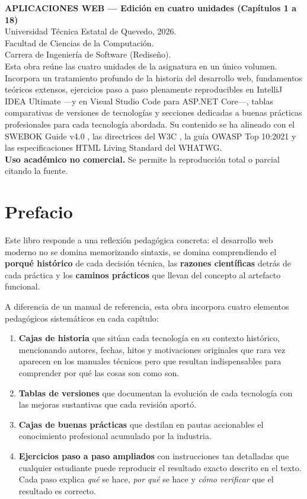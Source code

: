 \documentclass[11pt,a4paper,openany]{book}
\begin{document}
\thispagestyle{empty}
\vspace*{2cm}
\noindent\textbf{APLICACIONES WEB --- Edición en cuatro unidades (Capítulos 1 a 18)}\\[0.3cm]
\noindent Universidad Técnica Estatal de Quevedo, 2026.\\
Facultad de Ciencias de la Computación.\\
Carrera de Ingeniería de Software (Rediseño).\\[0.4cm]
\noindent Esta obra reúne las cuatro unidades de la asignatura en un único
volumen. Incorpora un tratamiento profundo de la historia del desarrollo
web, fundamentos teóricos extensos, ejercicios paso a paso plenamente
reproducibles en IntelliJ IDEA Ultimate ---y en Visual Studio Code para
ASP.NET Core---, tablas comparativas de versiones de tecnologías y
secciones dedicadas a buenas prácticas profesionales para cada tecnología
abordada. Su contenido se ha alineado con el SWEBOK Guide v4.0
\cite{washizaki2024swebok}, las directrices del W3C \cite{w3c2018wcag}, la
guía OWASP Top 10:2021 \cite{owasp2021top10} y las especificaciones HTML
Living Standard del WHATWG.\\[0.4cm]
\noindent\textbf{Uso académico no comercial.} Se permite la reproducción
total o parcial citando la fuente.
\newpage

\chapter*{Prefacio}

Este libro responde a una reflexión pedagógica concreta: el desarrollo web
moderno no se domina memorizando sintaxis, se domina comprendiendo el
\textbf{porqué histórico} de cada decisión técnica, las \textbf{razones
científicas} detrás de cada práctica y los \textbf{caminos prácticos} que
llevan del concepto al artefacto funcional.

A diferencia de un manual de referencia, esta obra incorpora cuatro
elementos pedagógicos sistemáticos en cada capítulo:

\begin{enumerate}
\item \textbf{Cajas de historia} que sitúan cada tecnología en su contexto
histórico, mencionando autores, fechas, hitos y motivaciones originales que
rara vez aparecen en los manuales técnicos pero que resultan indispensables
para comprender por qué las cosas son como son.
\item \textbf{Tablas de versiones} que documentan la evolución de cada
tecnología con las mejoras sustantivas que cada revisión aportó.
\item \textbf{Cajas de buenas prácticas} que destilan en pautas accionables
el conocimiento profesional acumulado por la industria.
\item \textbf{Ejercicios paso a paso ampliados} con instrucciones tan
detalladas que cualquier estudiante puede reproducir el resultado exacto
descrito en el texto. Cada paso explica \emph{qué} se hace, \emph{por qué}
se hace y \emph{cómo verificar} que el resultado es correcto.
\end{enumerate}
\end{document}
